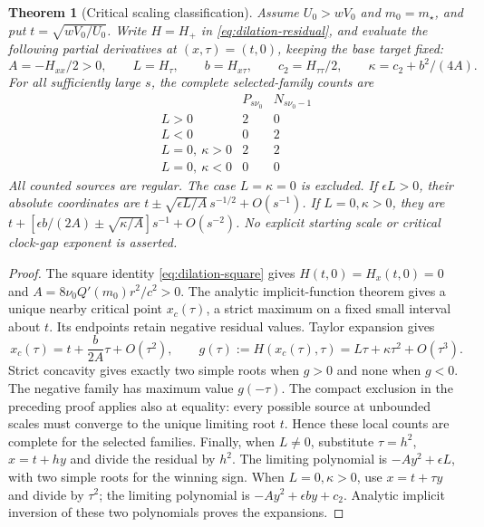 \documentclass[11pt,a4paper]{article}
\newtheorem{theorem}{Theorem}[section]
\theoremstyle{remark}\newtheorem{remark}[theorem]{Remark}
\begin{document}
\begin{theorem}[Critical scaling classification]
\label{thm:dilation-critical}
Assume $U_0>wV_0$ and $m_0=m_\star$, and put $t=\sqrt{wV_0/U_0}$.
Write $H=H_+$ in \eqref{eq:dilation-residual}, and evaluate the following
partial derivatives at $(x,\tau)=(t,0)$, keeping the base target fixed:
\begin{equation}\label{eq:dilation-critical-coefficients}
 A=-H_{xx}/2>0,\qquad L=H_\tau,\qquad b=H_{x\tau},\qquad
 c_2=H_{\tau\tau}/2,\qquad \kappa=c_2+b^2/(4A).
\end{equation}
For all sufficiently large $s$, the complete selected-family counts are
\[
\begin{array}{c|cc}
 &P_{s\nu_0}&N_{s\nu_0-1}\\ \hline
 L>0&2&0\\
 L<0&0&2\\
 L=0,\ \kappa>0&2&2\\
 L=0,\ \kappa<0&0&0
\end{array}
\]
All counted sources are regular. The case $L=\kappa=0$ is excluded.
If $\epsilon L>0$, their absolute coordinates are
$t\pm\sqrt{\epsilon L/A}\,s^{-1/2}+O(s^{-1})$.
If $L=0,\kappa>0$, they are
$t+[\epsilon b/(2A)\pm\sqrt{\kappa/A}]s^{-1}+O(s^{-2})$.
No explicit starting scale or critical clock-gap exponent is asserted.
\end{theorem}
\begin{proof}
The square identity \eqref{eq:dilation-square} gives
$H(t,0)=H_x(t,0)=0$ and
$A=8\nu_0Q'(m_0)r^2/c^2>0$.
The analytic implicit-function theorem gives a unique nearby critical
point $x_c(\tau)$, a strict maximum on a fixed small interval about $t$.
Its endpoints retain negative residual values. Taylor expansion gives
\[
 x_c(\tau)=t+\frac b{2A}\tau+O(\tau^2),\qquad
 g(\tau):=H(x_c(\tau),\tau)=L\tau+\kappa\tau^2+O(\tau^3).
\]
Strict concavity gives exactly two simple roots when $g>0$ and none
when $g<0$. The negative family has maximum value $g(-\tau)$.
The compact exclusion in the preceding proof applies also at equality:
every possible source at unbounded scales must converge to the unique
limiting root $t$. Hence these local counts are complete for the selected
families. Finally, when $L\ne0$, substitute $\tau=h^2$, $x=t+hy$ and
divide the residual by $h^2$. The limiting polynomial is
$-Ay^2+\epsilon L$, with two simple roots for the winning sign.
When $L=0,\kappa>0$, use $x=t+\tau y$ and divide by $\tau^2$;
the limiting polynomial is $-Ay^2+\epsilon by+c_2$.
Analytic implicit inversion of these two polynomials proves the expansions.
\end{proof}
\end{document}
